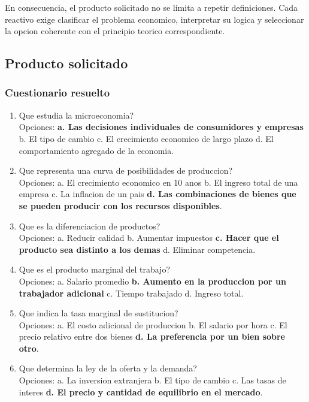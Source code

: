 \documentclass[
	spanish,
	letterpaper, oneside
]{article}
\begin{document}
En consecuencia, el producto solicitado no se limita a repetir definiciones. Cada reactivo exige clasificar el problema economico, interpretar su logica y seleccionar la opcion coherente con el principio teorico correspondiente.

\subsection{Producto solicitado}

\subsubsection{Cuestionario resuelto}

\begin{enumerate}
	\item Que estudia la microeconomia?\\
	Opciones: \textbf{a. Las decisiones individuales de consumidores y empresas} \quad b. El tipo de cambio \quad c. El crecimiento economico de largo plazo \quad d. El comportamiento agregado de la economia.

	\item Que representa una curva de posibilidades de produccion?\\
	Opciones: a. El crecimiento economico en 10 anos \quad b. El ingreso total de una empresa \quad c. La inflacion de un pais \quad \textbf{d. Las combinaciones de bienes que se pueden producir con los recursos disponibles}.

	\item Que es la diferenciacion de productos?\\
	Opciones: a. Reducir calidad \quad b. Aumentar impuestos \quad \textbf{c. Hacer que el producto sea distinto a los demas} \quad d. Eliminar competencia.

	\item Que es el producto marginal del trabajo?\\
	Opciones: a. Salario promedio \quad \textbf{b. Aumento en la produccion por un trabajador adicional} \quad c. Tiempo trabajado \quad d. Ingreso total.

	\item Que indica la tasa marginal de sustitucion?\\
	Opciones: a. El costo adicional de produccion \quad b. El salario por hora \quad c. El precio relativo entre dos bienes \quad \textbf{d. La preferencia por un bien sobre otro}.

	\item Que determina la ley de la oferta y la demanda?\\
	Opciones: a. La inversion extranjera \quad b. El tipo de cambio \quad c. Las tasas de interes \quad \textbf{d. El precio y cantidad de equilibrio en el mercado}.


\end{enumerate}
\end{document}
